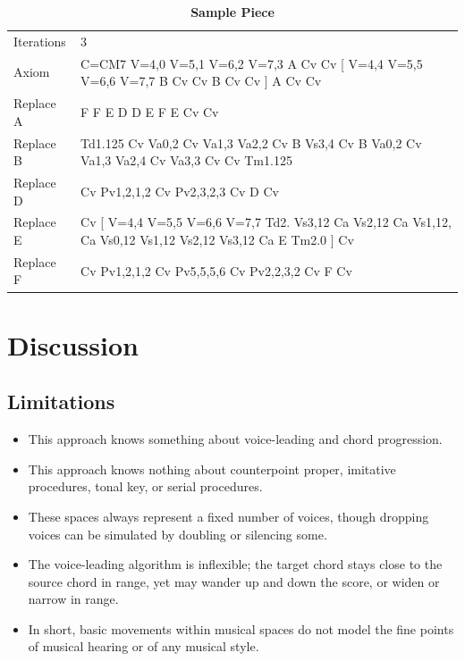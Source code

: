 \documentclass[14pt,letterpaper,onecolumn]{scrartcl}
\begin{document}
\begin{itemize}
\begin{table}[tbp]
\begin{tabular}{l|p{12cm}}
\hline
Iterations & 3\\
Axiom & \ttfamily C=CM7 V=4,0 V=5,1 V=6,2 V=7,3 A Cv Cv [ V=4,4 V=5,5 V=6,6 V=7,7 B Cv Cv B Cv Cv ] A Cv Cv\\
Replace \ttfamily A & \ttfamily F F E D D E F E Cv Cv\\
Replace \ttfamily B & \ttfamily Td1.125 Cv Va0,2 Cv Va1,3 Va2,2 Cv B Vs3,4 Cv B Va0,2 Cv Va1,3 Va2,4 Cv Va3,3 Cv Cv Tm1.125\\
Replace \ttfamily D & \ttfamily Cv Pv1,2,1,2 Cv Pv2,3,2,3 Cv D Cv\\
Replace \ttfamily E & \ttfamily Cv [ V=4,4 V=5,5 V=6,6 V=7,7 Td2. Vs3,12 Ca Vs2,12 Ca Vs1,12, Ca Vs0,12 Vs1,12 Vs2,12 Vs3,12 Ca E Tm2.0 ] Cv\\
Replace \ttfamily F & \ttfamily Cv Pv1,2,1,2 Cv Pv5,5,5,6 Cv Pv2,2,3,2 Cv F Cv\\
\hline
\end{tabular}
\caption{\textbf{Sample Piece}}
\label{tab:samplepiece}
\end{table}

\end{itemize}

\section{Discussion}

\subsection{Limitations}

\begin{itemize}

\item This approach knows something about voice-leading and chord progression.

\item This approach knows nothing about counterpoint proper, imitative procedures, tonal key, or serial procedures.

\item These spaces always represent a fixed number of voices, though dropping voices can be simulated by doubling or silencing some. 

\item The voice-leading algorithm is inflexible; the target chord stays close to the source chord in range, yet may wander up and down the score, or widen or narrow in range. 

\item In short, basic movements within musical spaces do not model the fine points of musical hearing or of any musical style.

\end{itemize}
\end{document}

